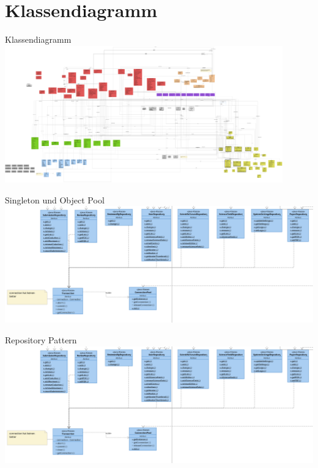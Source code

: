 \documentclass{beamer}
\begin{document}
    \section{Klassendiagramm}
    \begin{frame}{Klassendiagramm}
        \centering
        \includegraphics[width=0.9\textwidth]{../../docs/Entwurf/graphics/klassendiagramm_png.png}
    \end{frame}



    \begin{frame}{Singleton und Object Pool}
        \centering
        \includegraphics[width=\textwidth]{../../docs/Entwurf/graphics/persistence_repository.png}
    \end{frame}

    \begin{frame}{Repository Pattern}
        \centering
        \includegraphics[width=\textwidth]{../../docs/Entwurf/graphics/persistence_repository.png}
    \end{frame}
\end{document}
